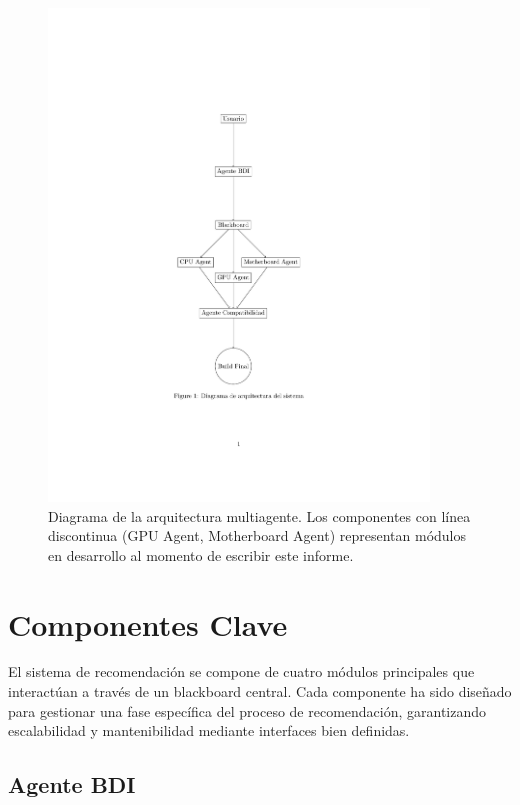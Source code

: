 \documentclass{llncs}
\begin{document}
    \begin{figure}[h]
    	\centering
    	\includegraphics[width=0.9\textwidth]{diagrama_arquitectura.pdf}
    	\caption{Diagrama de la arquitectura multiagente. Los componentes con línea discontinua (GPU Agent, Motherboard Agent) representan módulos en desarrollo al momento de escribir este informe.}
    	\label{fig:arquitectura}
    \end{figure}
	
	\section{Componentes Clave}
	\label{sec:componentes}
	
	El sistema de recomendación se compone de cuatro módulos principales que interactúan a través de un blackboard central. Cada componente ha sido diseñado para gestionar una fase específica del proceso de recomendación, garantizando escalabilidad y mantenibilidad mediante interfaces bien definidas.
	
	\subsection{Agente BDI}
	\label{subsec:bdi}
	
\end{document}
